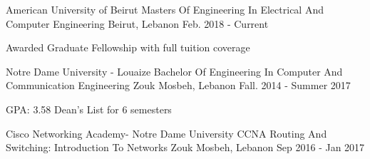

\begin{cventries}

  \cventry
    {American University of Beirut} %
    {Masters Of Engineering In Electrical And Computer Engineering} %
    {Beirut, Lebanon} %
    {Feb. 2018 - Current} %
    {
      \begin{cvitems} %
        \item {Awarded Graduate Fellowship with full tuition coverage }
      \end{cvitems}
    }

  \cventry
    {Notre Dame University - Louaize} %
    {Bachelor Of Engineering In Computer And Communication Engineering} %
    {Zouk Mosbeh, Lebanon} %
    {Fall. 2014 - Summer 2017} %
    {
      \begin{cvitems} %
        \item {GPA: 3.58   Dean’s  List for 6 semesters}
      \end{cvitems}
    }


  \cventry
    {Cisco Networking Academy- Notre Dame University} %
    {CCNA Routing And Switching: Introduction To Networks} %
    {Zouk Mosbeh, Lebanon} %
    {Sep 2016 - Jan 2017} %
    {}


\end{cventries}

